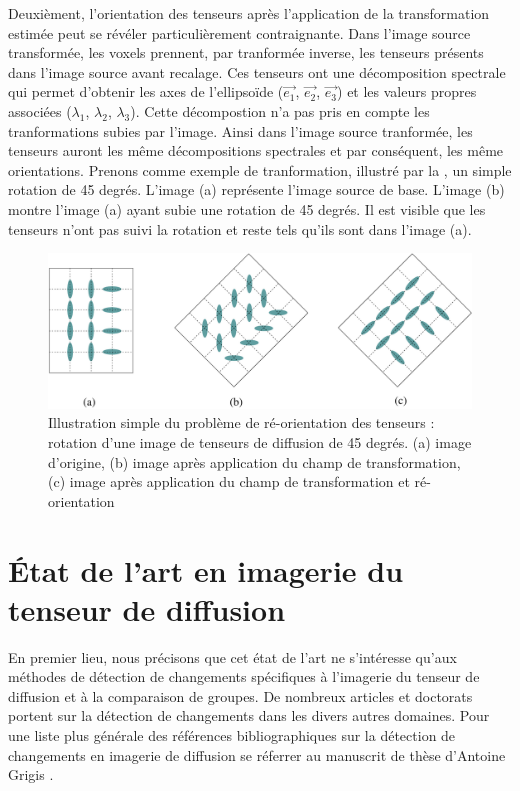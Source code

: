 Deuxièment, l'orientation des tenseurs après l'application de la transformation estimée peut se révéler particulièrement contraignante.
Dans l'image source transformée, les voxels prennent, par tranformée inverse, les tenseurs présents dans l'image source avant recalage.
Ces tenseurs ont une décomposition spectrale qui permet d'obtenir les axes de l'ellipsoïde ($\overset{\rightarrow}{e_1}$, $\overset{\rightarrow}{e_2}$, $\overset{\rightarrow}{e_3}$) 
et les valeurs propres associées ($\lambda_1$, $\lambda_2$, $\lambda_3$).
Cette décompostion n'a pas pris en compte les tranformations subies par l'image.
Ainsi dans l'image source tranformée, les tenseurs auront les même décompositions spectrales et par conséquent, les même orientations.
Prenons comme exemple de tranformation, illustré par la , un simple rotation de 45 degrés.
L'image (a) représente l'image source de base.
L'image (b) montre l'image (a) ayant subie une rotation de 45 degrés. 
Il est visible que les tenseurs n'ont pas suivi la rotation et reste tels qu'ils sont dans l'image (a).\\

\begin{figure}[htpb]
    \centering
    \includegraphics[scale=0.6]{Images/reorientation.pdf}
    \caption{\label{fig_reorientation} Illustration simple du problème de ré-orientation des tenseurs : rotation d'une image de tenseurs de diffusion de 45 degrés. (a) image d'origine, (b) image après application du champ de transformation,
    (c) image après application du champ de transformation et ré-orientation}
\end{figure}


\section{État de l'art en imagerie du tenseur de diffusion}
\label{etat_art}
En premier lieu, nous précisons que cet état de l'art ne s'intéresse qu'aux méthodes de détection de changements spécifiques
à l'imagerie du tenseur de diffusion et à la comparaison de groupes.
De nombreux articles et doctorats portent sur la détection de changements dans les divers autres domaines.
Pour une liste plus générale des références bibliographiques sur la détection de changements en imagerie de diffusion 
se réferrer au manuscrit de thèse d'Antoine Grigis \cite{Grigis_PhD}.\\

